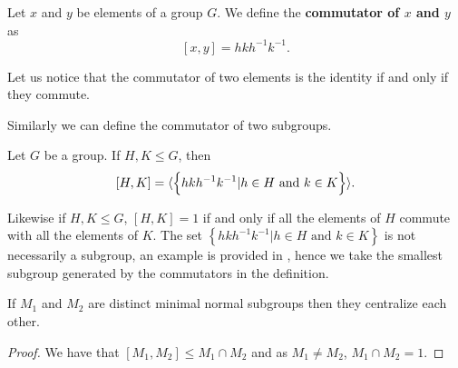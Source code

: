 \begin{definition}
    Let $x$ and $y$ be elements of a group $G$. We define the \textbf{commutator of $x$ and $y$} as 
    $$
    [x,y] = hkh^{-1}k^{-1}.
    $$
\end{definition}

Let us notice that the commutator of two elements is the identity if and only if they commute.

Similarly we can define the commutator of two subgroups.

\begin{definition}
    \label{S1:groupcommutator}
    Let $G$ be a group. If $H, K \le G$, then
    $$
    [H,K] = \langle \left\{ hkh^{-1}k^{-1} | h \in H \text{ and } k \in K \right\} \rangle.
    $$ 
\end{definition}

Likewise if $H,K \le G$, $[H,K] = 1$ if and only if all the elements of $H$ commute with all the elements of $K$.
The set $\left\{ hkh^{-1}k^{-1} | h \in H \text{ and } k \in K \right\}$ is not necessarily a subgroup, an example is provided in \cite{CassidyPCANACAE}, hence we take the smallest subgroup generated by the commutators in the definition.

\begin{theorem}
    \label{mnsubsc}
    If $M_1$ and $M_2$ are distinct minimal normal subgroups then they centralize each other.
\end{theorem}

\begin{proof}
    We have that $[ M_1, M_2] \le M_1 \cap M_2$ and as $M_1 \ne M_2$, $M_1 \cap M_2 = 1$.
\end{proof}